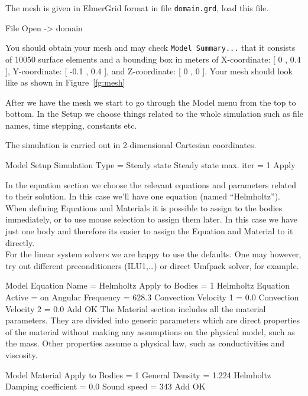 The mesh is given in ElmerGrid format in file \texttt{domain.grd}, load this file.

\ttbegin
File 
  Open -> domain
\ttend

You should obtain your mesh and may check \texttt{Model Summary...} that it consists of 10050 surface elements and a bounding box in meters of X-coordinate: [ 0 ,  0.4 ], Y-coordinate: [ -0.1 ,  0.4 ], and Z-coordinate: [ 0 ,  0 ].  Your mesh should look like as shown in Figure~\ref{fg:mesh}

After we have the mesh we start to go through the Model menu from the top to bottom.  In the Setup we choose things related to the whole simulation such as file names, time stepping, constants etc.  

The simulation is carried out in 2-dimensional Cartesian coordinates.

\ttbegin
Model
  Setup 
    Simulation Type = Steady state
    Steady state max. iter = 1
  Apply
\ttend

In the equation section we choose the relevant equations and parameters related to their solution.  In this case we'll have one equation (named ``Helmholtz'').\\

When defining Equations and Materials it is possible to assign to the bodies immediately, or to use mouse selection to assign them later. In this case we have just one body and therefore its easier to assign the Equation and Material to it directly.\\

For the linear system solvers we are happy to use the defaults. One may however, try out different preconditioners (ILU1,\ldots) or direct Umfpack solver, for example.

\ttbegin
Model
  Equation
   Name = Helmholtz
    Apply to Bodies = 1
    Helmholtz Equation
      Active = on
      Angular Frequency = 628.3
      Convection Velocity 1 = 0.0
      Convection Velocity 2 = 0.0
    Add 
    OK
\ttend        
The Material section includes all the material parameters. They are divided into generic parameters which are direct properties of the material without making any assumptions on the physical model, such as the mass. Other properties assume a physical law, such as conductivities and viscosity. 

\ttbegin
Model
  Material
    Apply to Bodies = 1 
    General 
      Density = 1.224
    Helmholtz
      Damping coefficient = 0.0
      Sound speed = 343
    Add
    OK
\ttend

